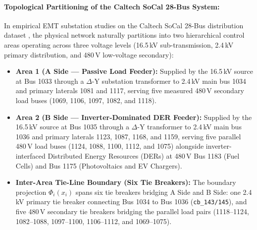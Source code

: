 \documentclass[11pt]{article}
\begin{document}
\paragraph{Topological Partitioning of the Caltech SoCal 28-Bus System:}
In empirical EMT substation studies on the Caltech SoCal 28-Bus distribution dataset \cite{Xie2026SoCal}, the physical network naturally partitions into two hierarchical control areas operating across three voltage levels (16.5\,kV sub-transmission, 2.4\,kV primary distribution, and 480\,V low-voltage secondary):
\begin{itemize}
    \item \textbf{Area 1 (A Side --- Passive Load Feeder):} Supplied by the 16.5\,kV source at Bus 1033 through a $\Delta\text{-Y}$ substation transformer to 2.4\,kV main bus 1034 and primary laterals 1081 and 1117, serving five measured 480\,V secondary load buses (1069, 1106, 1097, 1082, and 1118).
    \item \textbf{Area 2 (B Side --- Inverter-Dominated DER Feeder):} Supplied by the 16.5\,kV source at Bus 1035 through a $\Delta\text{-Y}$ transformer to 2.4\,kV main bus 1036 and primary laterals 1123, 1087, 1168, and 1159, serving five parallel 480\,V load buses (1124, 1088, 1100, 1112, and 1075) alongside inverter-interfaced Distributed Energy Resources (DERs) at 480\,V Bus 1183 (Fuel Cells) and Bus 1175 (Photovoltaics and EV Chargers).
    \item \textbf{Inter-Area Tie-Line Boundary (Six Tie Breakers):} The boundary projection $\Phi_i(x_i)$ spans six tie breakers bridging A Side and B Side: one 2.4\,kV primary tie breaker connecting Bus 1034 to Bus 1036 (\texttt{cb\_143/145}), and five 480\,V secondary tie breakers bridging the parallel load pairs (1118--1124, 1082--1088, 1097--1100, 1106--1112, and 1069--1075).
\end{itemize}
\end{document}

